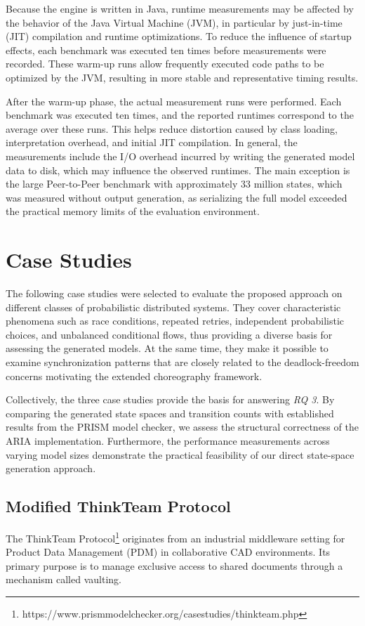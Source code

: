 Because the engine is written in Java, runtime measurements may be affected by the behavior of the Java Virtual Machine (JVM), in particular by just-in-time (JIT) compilation and runtime optimizations. To reduce the influence of startup effects, each benchmark was executed ten times before measurements were recorded. These warm-up runs allow frequently executed code paths to be optimized by the JVM, resulting in more stable and representative timing results.

After the warm-up phase, the actual measurement runs were performed. Each benchmark was executed ten times, and the reported runtimes correspond to the average over these runs. This helps reduce distortion caused by class loading, interpretation overhead, and initial JIT compilation. In general, the measurements include the I/O overhead incurred by writing the generated model data to disk, which may influence the observed runtimes. The main exception is the large Peer-to-Peer benchmark with approximately 33 million states, which was measured without output generation, as serializing the full model exceeded the practical memory limits of the evaluation environment.

\section{Case Studies}
The following case studies were selected to evaluate the proposed approach on different classes of probabilistic distributed systems. They cover characteristic phenomena such as race conditions, repeated retries, independent probabilistic choices, and unbalanced conditional flows, thus providing a diverse basis for assessing the generated models. At the same time, they make it possible to examine synchronization patterns that are closely related to the deadlock-freedom concerns motivating the extended choreography framework.

Collectively, the three case studies provide the basis for answering \textit{RQ 3}. By comparing the generated state spaces and transition counts with established results from the PRISM model checker, we assess the structural correctness of the \textsc{ARIA} implementation. Furthermore, the performance measurements across varying model sizes demonstrate the practical feasibility of our direct state-space generation approach.
\subsection{Modified ThinkTeam Protocol}
\label{sec:think_team}
The ThinkTeam Protocol\footnote{https://www.prismmodelchecker.org/casestudies/thinkteam.php} originates from an industrial middleware setting for Product Data Management (PDM) in collaborative CAD environments. Its primary purpose is to manage exclusive access to shared documents through a mechanism called vaulting.

